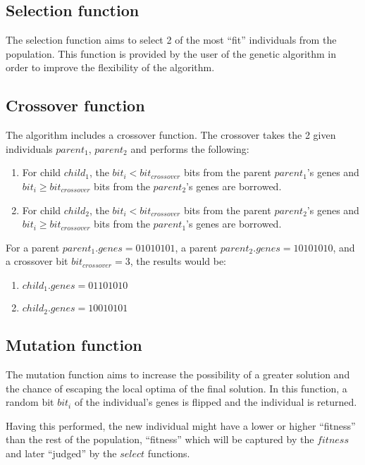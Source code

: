 \documentclass[conference]{IEEEtran}
\begin{document}
\subsection{Selection function}
The selection function aims to select 2 of the most ``fit'' individuals from the population. This function is provided
by the user of the genetic algorithm in order to improve the flexibility of the algorithm.

\subsection{Crossover function}
The algorithm includes a crossover function. The crossover takes the 2 given individuals $parent_1$, $parent_2$ and performs the following:

\begin{enumerate}
    \item For child $child_1$, the $bit_i < bit_{crossover}$ bits from the parent $parent_1$'s genes and $bit_i \ge bit_{crossover}$ bits from the $parent_2$'s genes are borrowed.
    \item For child $child_2$, the $bit_i < bit_{crossover}$ bits from the parent $parent_2$'s genes and $bit_i \ge bit_{crossover}$ bits from the $parent_1$'s genes are borrowed.
\end{enumerate}

\break

For a parent $parent_1.genes = 01010101$, a parent $parent_2.genes = 10101010$, and a crossover bit $bit_{crossover} = 3$, the results would be:

\begin{enumerate}
    \item $child_1.genes = 01101010$
    \item $child_2.genes = 10010101$
\end{enumerate}

\subsection{Mutation function}
The mutation function aims to increase the possibility of a greater solution and the chance of escaping
the local optima of the final solution. In this function, a random bit $bit_i$ of the individual's genes
is flipped and the individual is returned.

Having this performed, the new individual might have a lower or higher ``fitness'' than the rest of the population,
``fitness'' which will be captured by the $fitness$ and later ``judged'' by the $select$ functions.
\end{document}
